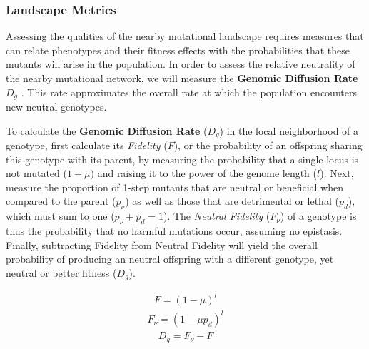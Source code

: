 \documentclass[10pt,letterpaper]{article}
\begin{document}
\subsubsection*{Landscape Metrics}
Assessing the qualities of the nearby mutational landscape requires measures that can relate phenotypes and their fitness effects with the probabilities that these mutants will arise in the population. In order to assess the relative neutrality of the nearby mutational network, we will measure the \textbf{Genomic Diffusion Rate} $D_g$ \cite{ofria_evolution_2002}. This rate approximates the overall rate at which the population encounters new neutral genotypes.

To calculate the \textbf{Genomic Diffusion Rate} ($D_g$) in the local neighborhood of a genotype, first calculate its \textit{Fidelity} ($F$), or the probability of an offspring sharing this genotype with its parent, by measuring the probability that a single locus is not mutated ($1-\mu)$ and raising it to the power of the genome length ($l$). Next, measure the proportion of 1-step mutants that are neutral or beneficial when compared to the parent ($p_\nu$) as well as those that are detrimental or lethal ($p_d$), which must sum to one ($p_\nu + p_d = 1$).  The \textit{Neutral Fidelity} ($F_\nu$) of a genotype is thus the probability that no harmful mutations occur, assuming no epistasis. Finally, subtracting Fidelity from Neutral Fidelity will yield the overall probability of producing an neutral offspring with a different genotype, yet neutral or better fitness ($D_g$).

\begin{eqnarray}
\label{eq:fidelity}
	F = (1 - \mu)^l
\end{eqnarray}
\begin{eqnarray}
\label{eq:neutral_fidelity}
	F_\nu = (1 - \mu p_d)^l
\end{eqnarray}
\begin{eqnarray}
\label{eq:genomic_diffusion_rate}
	D_g = F_\nu - F
\end{eqnarray}
\end{document}
